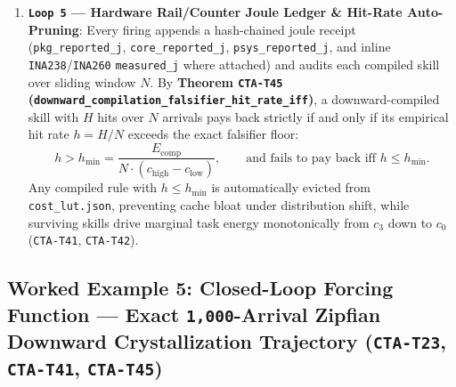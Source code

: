 \documentclass[10pt,letterpaper]{article}
\begin{document}
\begin{enumerate}
  \textbf{\texttt{Loop\ 4} --- Automatic Downward Crystallization
  (\texttt{C1/C4/C6\ -\textgreater{}\ C5\ -\textgreater{}\ C2\ -\textgreater{}\ C8})}:
  Every novel candidate must pass the terminal soundness + sandbox
  repeat-call gate (\texttt{C2} + \texttt{C10}, \texttt{0\ /\ 60} false
  commits). Once a verified structural witness recurs across threshold
  \(\tau_j\) arrivals, \texttt{promoteVerifiedTier} compiles it downward
  (\texttt{Tier\ 3\ -\textgreater{}\ Tier\ 2} rule extraction,
  \texttt{Tier\ 2\ -\textgreater{}\ Tier\ 1} \texttt{DNULLMM1} slot
  freeze, \texttt{Tier\ 1\ -\textgreater{}\ Tier\ 0} equivalence-checked
  \texttt{LUT6} truth-table page) at one-time compile cost
  \(E_{\text{comp}, j}\), preserving semantic soundness across all four
  tiers (\texttt{CTA-T44}, proved with \textbf{zero axioms}).
\item
  \textbf{\texttt{Loop\ 5} --- Hardware Rail/Counter Joule Ledger \&
  Hit-Rate Auto-Pruning}: Every firing appends a hash-chained joule
  receipt (\texttt{pkg\_\allowbreak{}reported\_\allowbreak{}j}, \texttt{core\_\allowbreak{}reported\_\allowbreak{}j},
  \texttt{psys\_\allowbreak{}reported\_\allowbreak{}j}, and inline \texttt{INA238}/\allowbreak{}\texttt{INA260}
  \texttt{measured\_\allowbreak{}j} where attached) and audits each compiled skill
  over sliding window \(N\). By \textbf{Theorem \texttt{CTA-T45}
  (\texttt{downward\_\allowbreak{}compilation\_\allowbreak{}falsifier\_\allowbreak{}hit\_\allowbreak{}rate\_\allowbreak{}iff})}, a
  downward-compiled skill with \(H\) hits over \(N\) arrivals pays back
  strictly if and only if its empirical hit rate \(h = H / N\) exceeds
  the exact falsifier floor:
  \[h > h_{\min} = \frac{E_{\text{comp}}}{N \cdot (c_{\text{high}} - c_{\text{low}})}, \qquad \text{and fails to pay back iff } h \le h_{\min}.\]
  Any compiled rule with \(h \le h_{\min}\) is automatically evicted
  from \texttt{cost\_\allowbreak{}lut.\allowbreak{}json}, preventing cache bloat under
  distribution shift, while surviving skills drive marginal task energy
  monotonically from \(c_3\) down to \(c_0\) (\texttt{CTA-T41},
  \texttt{CTA-T42}).
\end{enumerate}

\subsection{\texorpdfstring{Worked Example 5: Closed-Loop Forcing
Function --- Exact \texttt{1,000}-Arrival Zipfian Downward
Crystallization Trajectory (\texttt{CTA-T23}, \texttt{CTA-T41},
\texttt{CTA-T45})}{Worked Example 5: Closed-Loop Forcing Function --- Exact 1,000-Arrival Zipfian Downward Crystallization Trajectory (CTA-T23, CTA-T41, CTA-T45)}}\label{worked-example-5-closed-loop-forcing-function-exact-1000-arrival-zipfian-downward-crystallization-trajectory-cta-t23-cta-t41-cta-t45}
\end{document}
